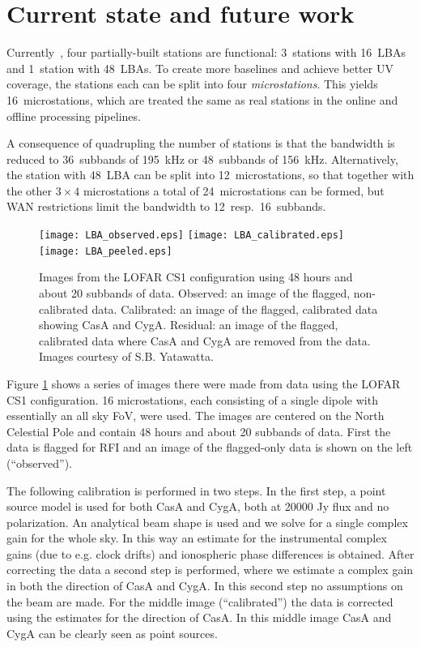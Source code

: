 \documentclass[journal]{IEEEtran}
\begin{document}
\section{Current state and future work}

Currently~\cite{gunst:06}, four partially-built stations are functional: 3~stations with
16~LBAs and 1~station with 48~LBAs.
To create more baselines and achieve better UV coverage, the stations each can be split into four {\em microstations}.
This yields 16~microstations, which are treated the same as real stations in
the online and offline processing pipelines.

A consequence of quadrupling the number of stations is that the bandwidth
is reduced to 36~subbands of 195~kHz or 48~subbands of 156~kHz.
Alternatively, the station with 48~LBA can be split into 12~microstations,
so that together with the other $3\times4$ microstations a total of
24~microstations can be formed,
but WAN restrictions limit the bandwidth to 12~resp.\ 16~subbands.

\begin{figure}
\centering
\texttt{[image: LBA\_observed.eps]}
\texttt{[image: LBA\_calibrated.eps]}
\texttt{[image: LBA\_peeled.eps]}
\caption{Images from the LOFAR CS1 configuration using 48 hours and about 20 subbands of data. Observed: an image of the flagged, non-calibrated data. Calibrated: an image of the flagged, calibrated data showing CasA and CygA. Residual: an image of the flagged, calibrated data where CasA and CygA are removed from the data. Images courtesy of S.B. Yatawatta.}
\label{fig:skymap}
\end{figure}

Figure \ref{fig:skymap} shows a series of images there were made from data using the LOFAR CS1 configuration. 16 microstations, each consisting of a single dipole with essentially an all sky FoV, were used. The images are centered on the North Celestial Pole and contain 48 hours and about 20 subbands of data. First the data is flagged for RFI and an image of the flagged-only data is shown on the left (``observed''). 

The following calibration is performed in two steps. In the first step, a point source model is used for both CasA and CygA, both at 20000 Jy flux and no polarization. An analytical beam shape is used and we solve for a single complex gain for the whole sky. In this way an estimate for the instrumental complex gains (due to e.g. clock drifts) and ionospheric phase differences is obtained. After correcting the data a second step is performed, where we estimate a complex gain in both the direction of CasA and CygA. In this second step no assumptions on the beam are made. For the middle image (``calibrated'') the data is corrected using the estimates for the direction of CasA. In this middle image CasA and CygA can be clearly seen as point sources. 
\end{document}

